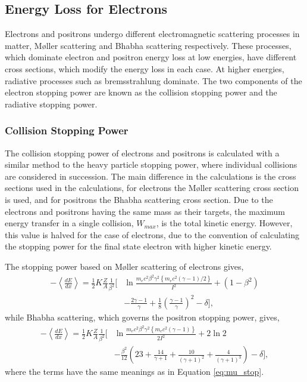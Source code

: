 \subsection{Energy Loss for Electrons}
Electrons and positrons undergo different electromagnetic scattering processes
in matter, M{\o}ller scattering and Bhabha scattering 
respectively\cite{10.2307/96528, 10.2307/96479}. These processes, which 
dominate electron and positron energy loss at low energies, have different 
cross sections, which modify the energy loss in each case. At higher energies, 
radiative processes such as bremsstrahlung dominate. The two components of the 
electron stopping power are known as the collision stopping power and the 
radiative stopping power.

\subsubsection*{Collision Stopping Power}
The collision stopping power of electrons and positrons is calculated with a
similar method to the heavy particle stopping power, where individual collisions
are considered in succession. The main difference in the calculations is the
cross sections used in the calculations, for electrons the M{\o}ller scattering
cross section is used, and for positrons the Bhabha scattering cross section. 
Due to the electrons and positrons having the same mass as their targets, the 
maximum energy transfer in a single collision, $W_{max}$, is the total kinetic 
energy. However, this value is halved for the case of electrons, due to the 
convention of calculating the stopping power for the final state electron with 
higher kinetic energy.

The stopping power based on M{\o}ller scattering of electrons gives,
\begin{align*}
	- \left< \frac{dE}{dx} \right> = \frac{1}{2} K \frac{Z}{A} \frac{1}{\beta^2}
	\bigg[ &\ln \frac{m_e c^2 \beta^2 \gamma^2 \left\{ m_e c^2 (\gamma - 1) / 2
	\right\} }{I^2} + (1 - \beta^2) \\
	&- \frac{2\gamma - 1}{\gamma} + \frac{1}{8} 
	\left(\frac{\gamma - 1}{\gamma}\right)^2 - \delta \bigg],
\end{align*}
while Bhabha scattering, which governs the positron stopping power, gives,
\begin{align*}
	- \left< \frac{dE}{dx} \right> = \frac{1}{2} K \frac{Z}{A} \frac{1}{\beta^2}
	\bigg[ &\ln \frac{m_e c^2 \beta^2 \gamma^2 \left\{ m_e c^2 (\gamma - 1) 
	\right\} }{2 I^2} 
	+ 2 \ln 2  \\ &-\frac{\beta^2}{12} \left(23 + \frac{14}{\gamma + 1} +
	\frac{10}{(\gamma + 1)^2} + \frac{4}{(\gamma + 1)^3}\right) - \delta \bigg],
\end{align*}
where the terms have the same meanings as in Equation 
\ref{eq:mu_stop}\cite{PhysRevD.98.030001}.


